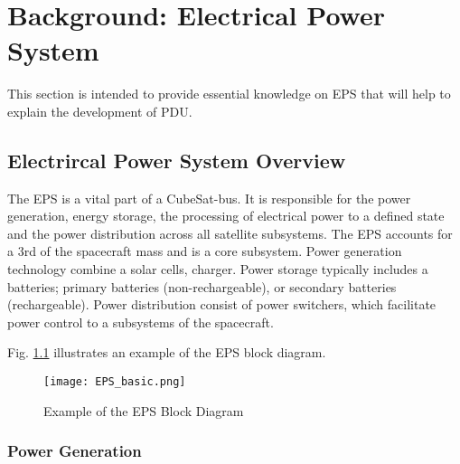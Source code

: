 \chapter{Background: Electrical Power System  \label{cha:chapter2}}
This section is intended to provide essential knowledge on EPS that will help to explain the development of PDU.
 

\section{Electrircal Power System Overview \label{sec:tech}}
The EPS is a vital part of a CubeSat-bus. It is responsible for the power generation, energy storage, the processing of electrical power to a defined state and the power distribution across all satellite subsystems. The EPS accounts for a 3rd of the spacecraft mass and is a core subsystem. Power generation technology combine a solar cells, charger. Power storage typically includes a batteries; primary batteries (non-rechargeable), or secondary batteries (rechargeable). Power distribution consist of power switchers, which facilitate power control to a subsystems of the spacecraft.

Fig. \ref{fig: EPSS} illustrates an example of the EPS block diagram.



	\begin{figure}[h]
		\centering
		\texttt{[image: EPS\_basic.png]}
			\caption{Example of the EPS Block Diagram}
			\label{fig: EPSS}
	\end{figure}

\subsection{Power Generation \label{sec:tech}}



